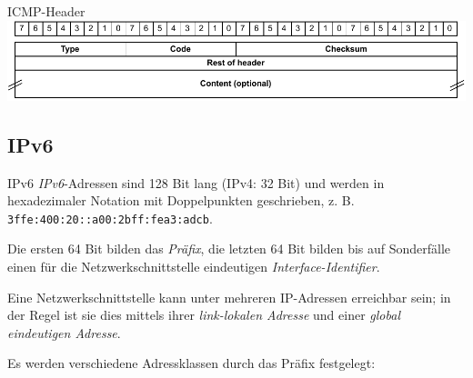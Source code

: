 \begin{defi}{ICMP-Header}
    \centering
    \includegraphics[width=.75\textwidth]{includes/figures/defi_icmp_header.pdf}
\end{defi}

\subsection{IPv6}

\begin{defi}{IPv6}
    \emph{IPv6}-Adressen sind 128 Bit lang (IPv4: 32 Bit) und werden in hexadezimaler Notation mit Doppelpunkten geschrieben, z. B. \texttt{3ffe:400:20::a00:2bff:fea3:adcb}.

    Die ersten 64 Bit bilden das \emph{Präfix}, die letzten 64 Bit bilden bis auf Sonderfälle einen für die Netzwerkschnittstelle eindeutigen \emph{Interface-Identifier}.

    Eine Netzwerkschnittstelle kann unter mehreren IP-Adressen erreichbar sein; in der Regel ist sie dies mittels ihrer \emph{link-lokalen Adresse} und einer \emph{global eindeutigen Adresse}.

    Es werden verschiedene Adressklassen durch das Präfix festgelegt:


\end{defi}
